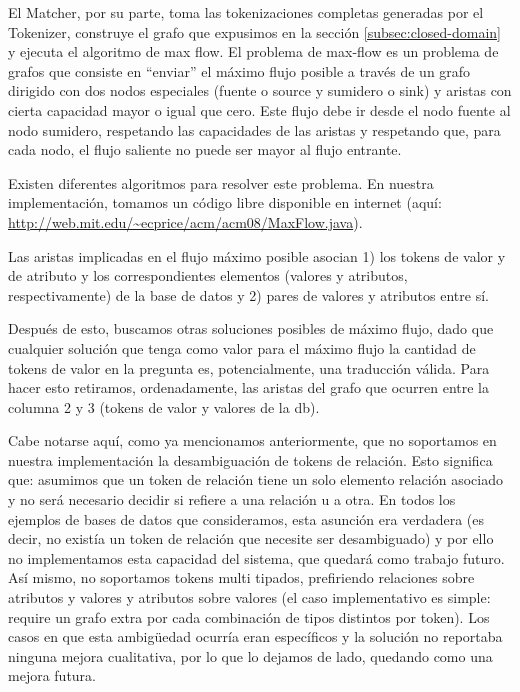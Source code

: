 El Matcher, por su parte, toma las tokenizaciones completas generadas por el Tokenizer, construye el grafo que expusimos en la sección \ref{subsec:closed-domain} y ejecuta el algoritmo de max flow. El problema de max-flow es un problema de grafos que consiste en “enviar” el máximo flujo posible a través de un grafo dirigido con dos nodos especiales (fuente o source y sumidero o sink) y aristas con cierta capacidad mayor o igual que cero. Este flujo debe ir desde el nodo fuente al nodo sumidero, respetando las capacidades de las aristas y respetando que, para cada nodo, el flujo saliente no puede ser mayor al flujo entrante.

Existen diferentes algoritmos para resolver este problema. En nuestra implementación, tomamos un código libre disponible en internet (aquí: \url{http://web.mit.edu/~ecprice/acm/acm08/MaxFlow.java}).

Las aristas implicadas en el flujo máximo posible asocian 1) los tokens de valor y de atributo y los correspondientes elementos (valores y atributos, respectivamente) de la base de datos y 2) pares de valores y atributos entre sí.

Después de esto, buscamos otras soluciones posibles de máximo flujo, dado que cualquier solución que tenga como valor para el máximo flujo la cantidad de tokens de valor en la pregunta es, potencialmente, una traducción válida. Para hacer esto retiramos, ordenadamente, las aristas del grafo que ocurren entre la columna 2 y 3 (tokens de valor y valores de la db).

Cabe notarse aquí, como ya mencionamos anteriormente, que no soportamos en nuestra implementación la desambiguación de tokens de relación. Esto significa que: asumimos que un token de relación tiene un solo elemento relación asociado y no será necesario decidir si refiere a una relación u a otra. En todos los ejemplos de bases de datos que consideramos, esta asunción era verdadera (es decir, no existía un token de relación que necesite ser desambiguado) y por ello no implementamos esta capacidad del sistema, que quedará como trabajo futuro. Así mismo, no soportamos tokens multi tipados, prefiriendo relaciones sobre atributos y valores y atributos sobre valores (el caso implementativo es simple: require un grafo extra por cada combinación de tipos distintos por token). Los casos en que esta ambigüedad ocurría eran específicos y la solución no reportaba ninguna mejora cualitativa, por lo que lo dejamos de lado, quedando como una mejora futura.

\medskip

